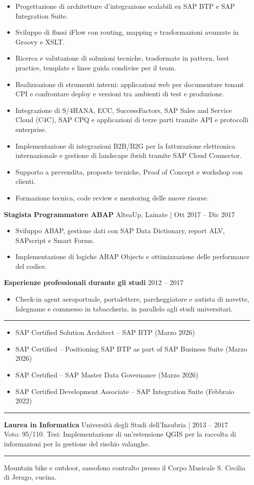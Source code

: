 \documentclass[10pt,a4paper]{article}
\newcommand{\sectiontitle}[1]{\vspace{8pt}{\large\bfseries #1}\par\vspace{3pt}\hrule\vspace{5pt}}
\begin{document}
\begin{itemize}
\item Progettazione di architetture d'integrazione scalabili su SAP BTP e SAP Integration Suite.
\item Sviluppo di flussi iFlow con routing, mapping e trasformazioni avanzate in Groovy e XSLT.
\item Ricerca e valutazione di soluzioni tecniche, trasformate in pattern, best practice, template e linee guida condivise per il team.
\item Realizzazione di strumenti interni: applicazioni web per documentare tenant CPI e confrontare deploy e versioni tra ambienti di test e produzione.
\item Integrazione di S/4HANA, ECC, SuccessFactors, SAP Sales and Service Cloud (C4C), SAP CPQ e applicazioni di terze parti tramite API e protocolli enterprise.
\item Implementazione di integrazioni B2B/B2G per la fatturazione elettronica internazionale e gestione di landscape ibridi tramite SAP Cloud Connector.
\item Supporto a prevendita, proposte tecniche, Proof of Concept e workshop con clienti.
\item Formazione tecnica, code review e mentoring delle nuove risorse.
\end{itemize}
\textbf{Stagista Programmatore ABAP} \hfill AlteaUp, Lainate | Ott 2017 -- Dic 2017
\begin{itemize}
\item Sviluppo ABAP, gestione dati con SAP Data Dictionary, report ALV, SAPscript e Smart Forms.
\item Implementazione di logiche ABAP Objects e ottimizzazione delle performance del codice.
\end{itemize}
\textbf{Esperienze professionali durante gli studi} \hfill 2012 -- 2017
\begin{itemize}
\item Check-in agent aeroportuale, portalettere, parcheggiatore e autista di navette, falegname e commesso in tabaccheria, in parallelo agli studi universitari.
\end{itemize}
\newpage
\sectiontitle{Certificazioni}
\begin{itemize}
\item SAP Certified Solution Architect -- SAP BTP (Marzo 2026)
\item SAP Certified -- Positioning SAP BTP as part of SAP Business Suite (Marzo 2026)
\item SAP Certified -- SAP Master Data Governance (Marzo 2026)
\item SAP Certified Development Associate -- SAP Integration Suite (Febbraio 2022)
\end{itemize}
\sectiontitle{Formazione}
\textbf{Laurea in Informatica} \hfill Università degli Studi dell'Insubria | 2013 -- 2017\\
Voto: 95/110. Tesi: Implementazione di un'estensione QGIS per la raccolta di informazioni per la gestione del rischio valanghe.
\sectiontitle{Interessi}
Mountain bike e outdoor, sassofono contralto presso il Corpo Musicale S. Cecilia di Jerago, cucina.
\end{document}
